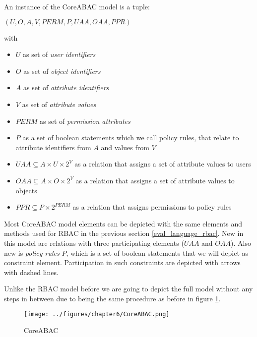 \documentclass[twoside, openright, 12pt]{book}
\begin{document}
\begin{xdefinition}[CoreABAC] 
An instance of the CoreABAC model is a tuple:
\begin{center}
$(U, O, A, V, \mathit{PERM}, P, \textit{UAA}, \mathit{OAA}, \mathit{PPR})$ 
\end{center}
\noindent
with

\begin{itemize}
\setlength\itemsep{0em}
\item $U$ as set of \textit{user identifiers}
\item $O$ as set of \textit{object identifiers}
\item $A$ as set of \textit{attribute identifiers}
\item $V$ as set of \textit{attribute values}
\item $\mathit{PERM}$ as set of \textit{permission attributes}
\item $P$ as a set of boolean statements which we call policy rules, that relate to attribute identifiers from $A$ and values from $V$
\item $\mathit{UAA} \subseteq A \times U \times 2^V$ as a relation that assigns a set of attribute values to users
\item $\mathit{OAA} \subseteq A \times O \times 2^V$ as a relation that assigns a set of attribute values to objects
\item $\mathit{PPR} \subseteq P \times 2^{\mathit{PERM}}$ as a relation that assigns permissions to policy rules
\end{itemize}
\label{definition:CoreABAC}
\end{xdefinition}

\noindent
Most CoreABAC model elements can be depicted with the same elements and methods used for RBAC in the previous section \ref{eval_language_rbac}.
New in this model are relations with three participating elements ($UAA$ and $OAA$).
Also new is \textit{policy rules} $P$, which is a set of boolean statements that we will depict as constraint element.
Participation in such constraints are depicted with arrows with dashed lines.

Unlike the RBAC model before we are going to depict the full model without any steps in between due to being the same procedure as before in figure \ref{fig:CoreABAC}.

\label{eval_language_coreabac}
\begin{figure}[htb]
	\centering
	\texttt{[image: ../figures/chapter6/CoreABAC.png]}
	\caption{CoreABAC}
	\label{fig:CoreABAC}
\end{figure}
\end{document}
